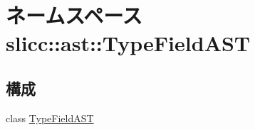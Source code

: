 \hypertarget{namespaceslicc_1_1ast_1_1TypeFieldAST}{
\section{ネームスペース slicc::ast::TypeFieldAST}
\label{namespaceslicc_1_1ast_1_1TypeFieldAST}
}
\subsection*{構成}
\begin{DoxyCompactItemize}
\item 
class \hyperlink{classslicc_1_1ast_1_1TypeFieldAST_1_1TypeFieldAST}{TypeFieldAST}
\end{DoxyCompactItemize}
